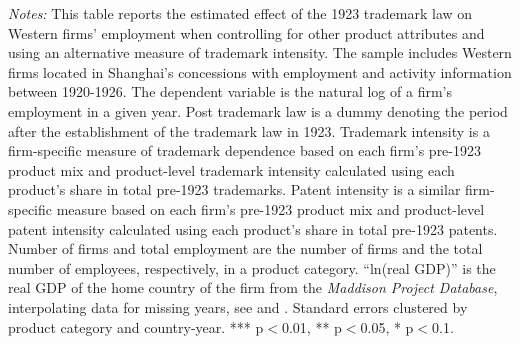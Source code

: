 \documentclass[12pt]{article}
\begin{document}
\begin{table}[hbt!]
{\begin{threeparttable}
\begin{tablenotes}[flushleft]
		\item \footnotesize \textit{Notes:} This table reports the estimated effect of the 1923 trademark law on Western firms' employment when controlling for other product attributes and using an alternative measure of trademark intensity. The sample includes Western firms located in Shanghai's concessions with employment and activity information between 1920-1926. The dependent variable is the natural log of a firm's employment in a given year. Post trademark law is a dummy denoting the period after the establishment of the trademark law in 1923. Trademark intensity is a firm-specific measure of trademark dependence based on each firm's pre-1923 product mix and product-level trademark intensity calculated using each product's share in total pre-1923 trademarks. Patent intensity is a similar firm-specific measure based on each firm's pre-1923 product mix and product-level patent intensity calculated using each product's share in total pre-1923 patents. Number of firms and total employment are the number of firms and the total number of employees, respectively, in a product category. ``ln(real GDP)'' is the real GDP of the home country of the firm from the \emph{Maddison Project Database}, interpolating data for missing years, see \citet{boltetal2018} and \citet{fouquinhugot2016}.  Standard errors clustered by product category and country-year. *** p$<$0.01, ** p$<$0.05, * p$<$0.1.
	\end{tablenotes}
\end{threeparttable}
}
\end{table}
\end{document}
